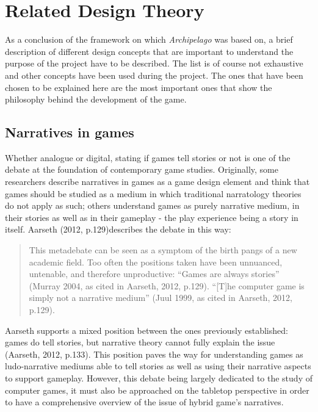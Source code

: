 


\section{Related Design Theory}
As a conclusion of the framework on which \textit{Archipelago} was based on, a brief description of different design concepts that are important to understand the purpose of the project have to be described. The list is of course not exhaustive and other concepts have been used during the project. The ones that have been chosen to be explained here are the most important ones that show the philosophy behind the development of the game. 
\subsection{Narratives in games}
Whether analogue or digital, stating if games tell stories or not is one of the debate at the foundation of contemporary game studies. Originally, some researchers describe narratives in games as a game design element and think that games should be studied as a medium in which traditional narratology theories do not apply as such; others understand games as purely narrative medium, in their stories as well as in their gameplay - the play experience being a story in itself. Aarseth (2012, p.129)\cite{art:aarseth}describes the debate in this way:
\begin{quotation}
This metadebate can be seen as a symptom of the birth pangs of a new academic field. Too often the positions taken have been unnuanced, untenable, and therefore unproductive: “Games are always stories” (Murray 2004, as cited in Aarseth, 2012, p.129). “[T]he computer game is simply not a narrative medium” (Juul 1999, as cited in Aarseth, 2012, p.129).
\end{quotation}
Aarseth supports a mixed position between the ones previously established: games do tell stories, but narrative theory cannot fully explain the issue (Aarseth, 2012, p.133). This position paves the way for understanding games as ludo-narrative mediums able to tell stories as well as using their narrative aspects to support gameplay. However, this debate being largely dedicated to the study of computer games, it must also be approached on the tabletop perspective in order to have a comprehensive overview of the issue of hybrid game's narratives.


